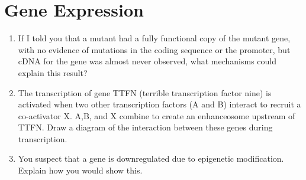 \documentclass[]{article}
\begin{document}
\section*{Gene Expression}
\begin{enumerate}
\item  If I told you that a mutant had a fully functional copy of the mutant gene, with no evidence of mutations in the coding sequence or the promoter, but cDNA for the gene was almost never observed, what mechanisms could explain this result?
\item The transcription of gene TTFN (terrible transcription factor nine) is activated when two other transcription factors (A and B) interact to recruit a co-activator X. A,B, and X combine to create an enhanceosome upstream of TTFN.  Draw a diagram of the interaction between these genes during transcription.   
\item You suspect that a gene is downregulated due to epigenetic modification. Explain how you would show this.
\end{enumerate}

\end{document}
